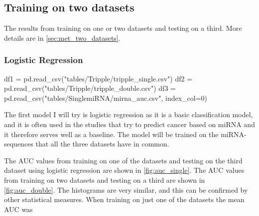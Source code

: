 {{{{{\subsection{Training on two datasets}
\label{subsec:res_two_datasets}
The results from training on one or two datasets and testing on a third. More details are in \autoref{sec:met_two_datasets}.

\subsubsection{Logistic Regression}
\begin{pycode}
df1 = pd.read_csv("tables/Tripple/tripple_single.csv")
df2 = pd.read_csv("tables/Tripple/tripple_double.csv")
df3 = pd.read_csv("tables/SinglemiRNA/mirna_auc.csv", index_col=0)
\end{pycode}
The first model I will try is logistic regression as it is a basic classification model, and it is often used in the studies that try to predict cancer based on miRNA and it therefore serves well as a baseline. The model will be trained on the miRNA-sequences that all the three datasets have in common.

The AUC values from training on one of the datasets and testing on the third dataset using logistic regression are shown in \autoref{fig:auc_single}. The AUC values from training on two datasets and testing on a third are shown in \autoref{fig:auc_double}. The histograms are very similar, and this can be confirmed by other statistical measures. When training on just one of the datasets the mean AUC was \py{"$%

}}}}}}
